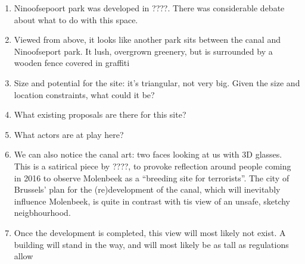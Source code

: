 \documentclass{article}
\begin{document}
\begin{enumerate}
	\item Ninoofsepoort park was developed in ????. There was considerable debate about what to do with this space.
	\item Viewed from above, it looks like another park sits between the canal and Ninoofseport park. It lush, overgrown greenery, but is surrounded by a wooden fence covered in graffiti 
	\item Size and potential for the site: it's triangular, not very big. Given the size and location constraints, what could it be?
	\item What existing proposals are there for this site?
	\item What actors are at play here?
	\item We can also notice the canal art: two faces looking at us with 3D glasses. This is a satirical piece by ????, to provoke reflection around people coming in 2016 to observe Molenbeek as a ``breeding site for terrorists''. The city of Brussels' plan for the (re)development of the canal, which will inevitably influence Molenbeek, is quite in contrast with tis view of an unsafe, sketchy neigbhourhood.
	\item Once the development is completed, this view will most likely not exist. A building will stand in the way, and will most likely be as tall as regulations allow
	
\end{enumerate}


\pagebreak

\printbibliography 
\end{document}
